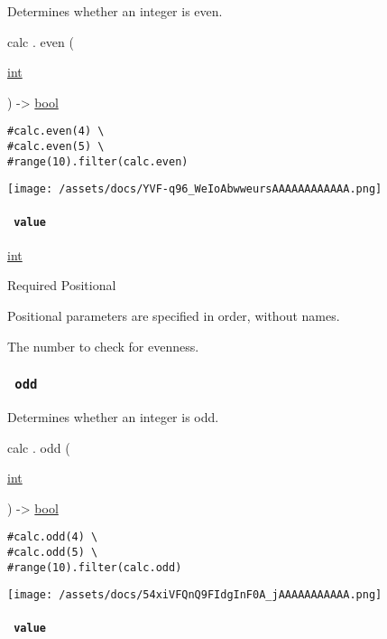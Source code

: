 Determines whether an integer is even.

calc { . } { even } (

{ \href{/docs/reference/foundations/int/}{int} }

) -\textgreater{} \href{/docs/reference/foundations/bool/}{bool}

\begin{verbatim}
#calc.even(4) \
#calc.even(5) \
#range(10).filter(calc.even)
\end{verbatim}

\texttt{[image: /assets/docs/YVF-q96\_WeIoAbwweursAAAAAAAAAAAA.png]}

\paragraph{\texorpdfstring{\texttt{\ value\ }}{ value }}\label{functions-even-value}

\href{/docs/reference/foundations/int/}{int}

{Required} {{ Positional }}

\label{functions-even-value-positional-tooltip}
Positional parameters are specified in order, without names.

The number to check for evenness.

\subsubsection{\texorpdfstring{\texttt{\ odd\ }}{ odd }}\label{functions-odd}

Determines whether an integer is odd.

calc { . } { odd } (

{ \href{/docs/reference/foundations/int/}{int} }

) -\textgreater{} \href{/docs/reference/foundations/bool/}{bool}

\begin{verbatim}
#calc.odd(4) \
#calc.odd(5) \
#range(10).filter(calc.odd)
\end{verbatim}

\texttt{[image: /assets/docs/54xiVFQnQ9FIdgInF0A\_jAAAAAAAAAAA.png]}

\paragraph{\texorpdfstring{\texttt{\ value\ }}{ value }}\label{functions-odd-value}

